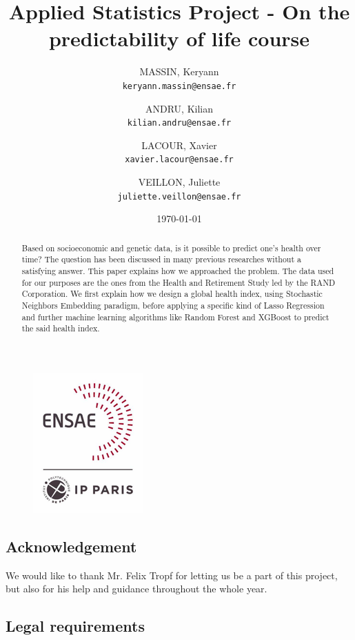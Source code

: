 \documentclass[]{article}
\title{Applied Statistics Project - On the predictability of life course}
\author{
	MASSIN, Keryann\\
	\texttt{keryann.massin@ensae.fr}
	\and
	ANDRU, Kilian\\
	\texttt{kilian.andru@ensae.fr}
	\and
	LACOUR, Xavier\\
	\texttt{xavier.lacour@ensae.fr}
	\and
	VEILLON, Juliette\\
	\texttt{juliette.veillon@ensae.fr}
}
\date{\today}
\begin{document}
\newcommand{\sklearn}{\textbf{scikit-learn} }

\maketitle
\thispagestyle{empty}
\begin{abstract}
	Based on socioeconomic and genetic data, is it possible to predict one's health over time? The question has been discussed in many previous researches without a satisfying answer. This paper explains how we approached the problem. The data used for our purposes are the ones from the Health and Retirement Study led by the RAND Corporation. We first explain how we design a global health index, using Stochastic Neighbors Embedding paradigm, before applying a specific kind of Lasso Regression and further machine learning algorithms like Random Forest and XGBoost to predict the said health index.
\end{abstract}
\begin{figure}[!h]
	\centering
	\includegraphics[scale=0.8]{ENSAE_logo.png}
\end{figure}

\newpage
\thispagestyle{empty}
\begin{center}
    \item\section*{Acknowledgement}
\end{center}
We would like to thank Mr. Felix Tropf for letting us be a part of this project, but also for his help and guidance throughout the whole year.

\begin{center}
    \item\section*{Legal requirements}
\end{center}
\end{document}
